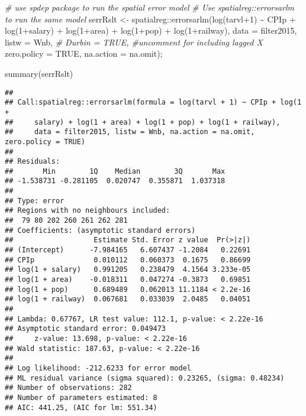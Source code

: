 \documentclass[
]{article}
\newenvironment{Shaded}{\begin{snugshade}}{\end{snugshade}}
\newcommand{\AttributeTok}[1]{\textcolor[rgb]{0.77,0.63,0.00}{#1}}
\newcommand{\CommentTok}[1]{\textcolor[rgb]{0.56,0.35,0.01}{\textit{#1}}}
\newcommand{\ConstantTok}[1]{\textcolor[rgb]{0.00,0.00,0.00}{#1}}
\newcommand{\DecValTok}[1]{\textcolor[rgb]{0.00,0.00,0.81}{#1}}
\newcommand{\FunctionTok}[1]{\textcolor[rgb]{0.00,0.00,0.00}{#1}}
\newcommand{\NormalTok}[1]{#1}
\newcommand{\OtherTok}[1]{\textcolor[rgb]{0.56,0.35,0.01}{#1}}
\newcommand{\SpecialCharTok}[1]{\textcolor[rgb]{0.00,0.00,0.00}{#1}}
\begin{document}
\begin{Shaded}
\begin{Highlighting}[]
\CommentTok{\# use spdep package to run the spatial error model }
\CommentTok{\# Use spatialreg::errorsarlm to run the same model}
\NormalTok{serrRslt }\OtherTok{\textless{}{-}}\NormalTok{ spatialreg}\SpecialCharTok{::}\FunctionTok{errorsarlm}\NormalTok{(}\FunctionTok{log}\NormalTok{(tarvl}\SpecialCharTok{+}\DecValTok{1}\NormalTok{) }\SpecialCharTok{\textasciitilde{}}\NormalTok{ CPIp }\SpecialCharTok{+}
                \FunctionTok{log}\NormalTok{(}\DecValTok{1}\SpecialCharTok{+}\NormalTok{salary) }\SpecialCharTok{+}
                \FunctionTok{log}\NormalTok{(}\DecValTok{1}\SpecialCharTok{+}\NormalTok{area) }\SpecialCharTok{+} \FunctionTok{log}\NormalTok{(}\DecValTok{1}\SpecialCharTok{+}\NormalTok{pop) }\SpecialCharTok{+}
                \FunctionTok{log}\NormalTok{(}\DecValTok{1}\SpecialCharTok{+}\NormalTok{railway),}
              \AttributeTok{data =}\NormalTok{ filter2015,}
              \AttributeTok{listw =}\NormalTok{ Wnb,}
              \CommentTok{\# Durbin = TRUE, \#uncomment for including lagged X}
              \AttributeTok{zero.policy =} \ConstantTok{TRUE}\NormalTok{, }
              \AttributeTok{na.action =}\NormalTok{ na.omit);}

\FunctionTok{summary}\NormalTok{(serrRslt)}
\end{Highlighting}
\end{Shaded}

\begin{verbatim}
## 
## Call:spatialreg::errorsarlm(formula = log(tarvl + 1) ~ CPIp + log(1 + 
##     salary) + log(1 + area) + log(1 + pop) + log(1 + railway), 
##     data = filter2015, listw = Wnb, na.action = na.omit, zero.policy = TRUE)
## 
## Residuals:
##       Min        1Q    Median        3Q       Max 
## -1.538731 -0.281105  0.020747  0.355871  1.037318 
## 
## Type: error 
## Regions with no neighbours included:
##  79 80 202 260 261 262 281 
## Coefficients: (asymptotic standard errors) 
##                   Estimate Std. Error z value  Pr(>|z|)
## (Intercept)      -7.984165   6.607437 -1.2084   0.22691
## CPIp              0.010112   0.060373  0.1675   0.86699
## log(1 + salary)   0.991205   0.238479  4.1564 3.233e-05
## log(1 + area)    -0.018311   0.047274 -0.3873   0.69851
## log(1 + pop)      0.689489   0.062013 11.1184 < 2.2e-16
## log(1 + railway)  0.067681   0.033039  2.0485   0.04051
## 
## Lambda: 0.67767, LR test value: 112.1, p-value: < 2.22e-16
## Asymptotic standard error: 0.049473
##     z-value: 13.698, p-value: < 2.22e-16
## Wald statistic: 187.63, p-value: < 2.22e-16
## 
## Log likelihood: -212.6233 for error model
## ML residual variance (sigma squared): 0.23265, (sigma: 0.48234)
## Number of observations: 282 
## Number of parameters estimated: 8 
## AIC: 441.25, (AIC for lm: 551.34)
\end{verbatim}
\end{document}
